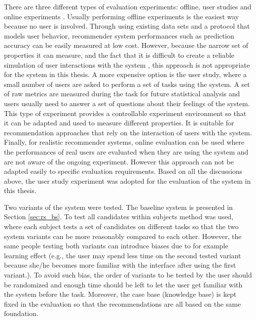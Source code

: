 There are three different types of evaluation experiments: offline, user studies and online experiments \cite{ref:35}. Usually performing offline experiments is the easiest way because no user is involved. Through using existing data sets and a protocol that models user behavior, recommender system performances such as prediction accuracy can be easily measured at low cost. However, because the narrow set of properties it can measure, and the fact that it is difficult to create a reliable simulation of user interactions with the system \cite{ref:35}, this approach is not appropriate for the system in this thesis. A more expensive option is the user study, where a small number of users are asked to perform a set of tasks using the system. A set of raw metrics are measured during the task for future statistical analysis and users usually need to answer a set of questions about their feelings of the system. This type of experiment provides a controllable experiment environment so that it can be adapted and used to measure different properties. It is suitable for recommendation approaches that rely on the interaction of users with the system. Finally, for realistic recommender systems, online evaluation can be used where the performances of real users are evaluated when they are using the system and are not aware of the ongoing experiment. However this approach can not be adapted easily to specific evaluation requirements. Based on all the discussions above, the user study experiment was adopted for the evaluation of the system in this thesis.

Two variants of the system were tested. The baseline system is presented in Section \ref{sec:rs_bs}. To test all candidates within subjects method was used, where each subject tests a set of candidates on different tasks \cite{ref:36} so that the two system variants can be more reasonably compared to each other. However, the same people testing both variants can introduce biases due to for example learning effect (e.g., the user may spend less time on the second tested variant because she/he becomes more familiar with the interface after using the first variant.). To avoid such bias, the order of variants to be tested by the user should be randomized and enough time should be left to let the user get familiar with the system before the task. Moreover, the case base (knowledge base) is kept fixed in the evaluation so that the recommendations are all based on the same foundation.

